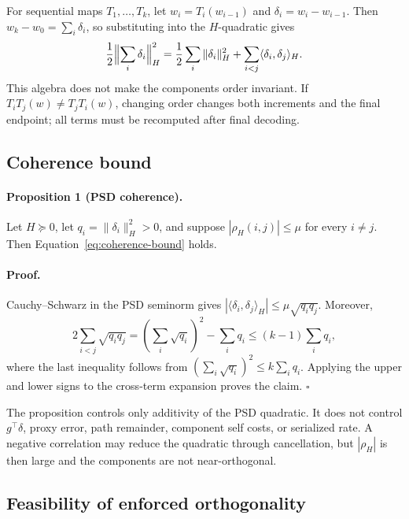 For sequential maps $T_1,\ldots,T_k$, let
$w_i=T_i(w_{i-1})$ and $\delta_i=w_i-w_{i-1}$.  Then
$w_k-w_0=\sum_i\delta_i$, so substituting into the $H$-quadratic gives
\begin{equation}
\frac12\Bigl\|\sum_i\delta_i\Bigr\|_H^2
=\frac12\sum_i\|\delta_i\|_H^2
+\sum_{i<j}\langle\delta_i,\delta_j\rangle_H.
\end{equation}
This algebra does not make the components order invariant.  If
$T_iT_j(w)\ne T_jT_i(w)$, changing order changes both increments and
the final endpoint; all terms must be recomputed after final decoding.

\subsection{Coherence bound}

\paragraph{Proposition 1 (PSD coherence).}
Let $H\succeq0$, let $q_i=\|\delta_i\|_H^2>0$, and suppose
$|\rho_H(i,j)|\le\mu$ for every $i\ne j$.  Then
Equation~\eqref{eq:coherence-bound} holds.

\paragraph{Proof.}
Cauchy--Schwarz in the PSD seminorm gives
$|\langle\delta_i,\delta_j\rangle_H|
\le\mu\sqrt{q_iq_j}$.  Moreover,
\begin{equation}
2\sum_{i<j}\sqrt{q_iq_j}
=\left(\sum_i\sqrt{q_i}\right)^2-\sum_iq_i
\le(k-1)\sum_iq_i,
\end{equation}
where the last inequality follows from
$(\sum_i\sqrt{q_i})^2\le k\sum_iq_i$.  Applying the upper and lower
signs to the cross-term expansion proves the claim. \hfill$\square$

The proposition controls only additivity of the PSD quadratic.  It
does not control $g^\top\delta$, proxy error, path remainder, component
self costs, or serialized rate.  A negative correlation may reduce the
quadratic through cancellation, but $|\rho_H|$ is then large and the
components are not near-orthogonal.

\subsection{Feasibility of enforced orthogonality}

